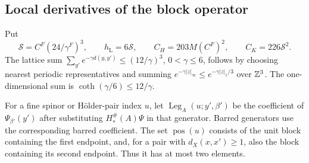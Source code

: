 \subsection{Local derivatives of the block operator}

Put
\[
 \mathcal S=C^F(24/\gamma^F)^3,\qquad
 h_{\mathrm L}=6\mathcal S,\qquad
 C_H=203M(C^F)^2,\qquad C_K=226\mathcal S^2.
\]
The lattice sum
$\sum_{y'}e^{-\gamma d(y,y')}\le(12/\gamma)^3$,
$0<\gamma\le6$, follows by choosing nearest periodic
representatives and summing
$e^{-\gamma|z|_\infty}\le e^{-\gamma|z|_1/3}$ over
$\mathbb Z^3$. The one-dimensional sum is
$\coth(\gamma/6)\le12/\gamma$.

For a fine spinor or Hölder-pair index $u$, let
$\operatorname{Leg}_A(u;y',\beta')$ be the coefficient
of $\Psi_{\beta'}(y')$ after substituting
$H_*^\#(A)\Psi$ in that generator. Barred generators
use the corresponding barred coefficient.
The set $\operatorname{pos}(u)$ consists of the unit
block containing the first endpoint, and, for a
pair with $d_X(x,x')\ge1$, also the block
containing its second endpoint. Thus it has at
most two elements.

